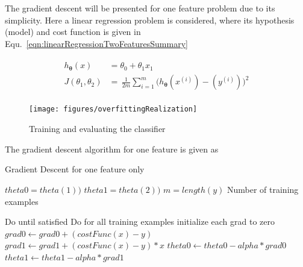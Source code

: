 The gradient descent will be presented for one feature problem due to its simplicity. Here a linear regression problem is considered, where its hypothesis (model) and cost function is given in Equ.~\ref{eqn:linearRegressionTwoFeaturesSummary}

\begin{align}
\label{eqn:linearRegressionTwoFeaturesSummary}
\begin{split}
h_{{\bm{\theta}}}(x) & = \theta_0 + \theta_1 x_1 
\\
J(\theta_1,\theta_2)
 & =\,
\frac{1}{2m} \sum\limits_{i=1}^{m} \Big(h_{\bm{\theta}}(x^{(i)}) - (y^{(i)})\Big)^2  
\end{split}
\end{align}


\begin{landscape}
\begin{figure}
\begin{center}
\texttt{[image: figures/overfittingRealization]}    %
\caption{Training and evaluating the classifier} 
\label{fig:trainingAndEvaluation}
\end{center}
\end{figure}
\end{landscape}




The gradient descent algorithm for one feature is given as 

 \begin{algorithm}
   \caption{Gradient Descent for one feature only}
    \begin{algorithmic}[1]
      

        \State $theta0 = theta(1))$  
        \State $theta1 = theta(2))$  
        \State $m = length(y)$ \Comment Number of training examples

         \Comment Do until satisfied
                     \Comment Do for all training examples
                         \State initialize each grad to zero
           	 	\State $grad0 \leftarrow grad0 + (costFunc(x) - y)$
		         \State $grad1 \leftarrow grad1 + (costFunc(x) - y) * x$
                    \EndFor
                    \State $theta0 \leftarrow theta0 - alpha * grad0$
                    \State $theta1 \leftarrow theta1 - alpha * grad1$
        \EndFor
       \EndFunction

\end{algorithmic}
\end{algorithm}
 
